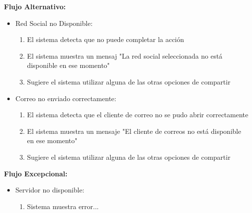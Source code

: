 \begin{multicols}{2}
\textbf{Flujo Alternativo:}
\begin{itemize}
    \item Red Social no Disponible:
    \begin{enumerate}
        \item El sistema detecta que no puede completar la acción
        \item El sistema muestra un mensaj "La red social seleccionada no está disponible en ese momento"
        \item Sugiere el sistema utilizar alguna de las otras opciones de compartir
    \end{enumerate}
    \item Correo no enviado correctamente:
    \begin{enumerate}
        \item El sistema detecta que el cliente de correo no se pudo abrir correctamente
        \item El sistema muestra un mensaje "El cliente de correos no está disponible en ese momento"
        \item Sugiere el sistema utilizar alguna de las otras opciones de compartir
    \end{enumerate}
\end{itemize}

\textbf{Flujo Excepcional:}
\begin{itemize}
    \item Servidor no disponible:
    \begin{enumerate}
        \item Sistema muestra error...
    \end{enumerate}
\end{itemize}


\end{multicols}